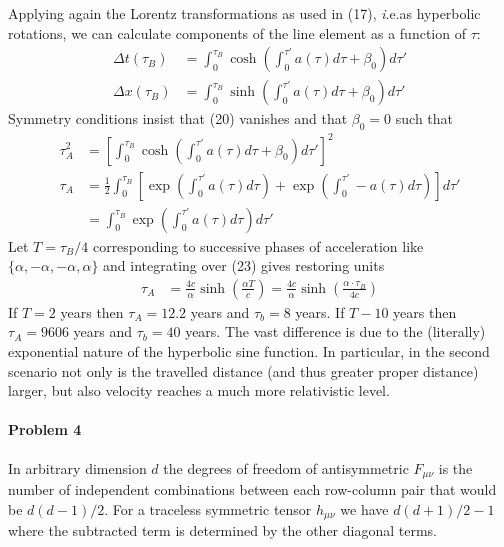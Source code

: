 \documentclass[10pt]{scrartcl}
\newcommand{\ie}{{\textit i.e.}}
\begin{document}
Applying again the Lorentz transformations as used in (17), \ie as hyperbolic rotations, we can calculate components of the line element as a function of $\tau$:
\begin{align}
	\Delta t(\tau_B) &= \int_{0}^{\tau_B}\cosh{\left(\int_{0}^{\tau'}a(\tau)d\tau + \beta_0\right)}d\tau'\\
	\Delta x(\tau_B) &= \int_{0}^{\tau_B}\sinh{\left(\int_{0}^{\tau'}a(\tau)d\tau + \beta_0\right)}d\tau'
\end{align}   
Symmetry conditions insist that (20) vanishes and that $\beta_0=0$ such that
\begin{align}
\tau_A^2 &=	\left[\int_{0}^{\tau_B}\cosh{\left(\int_{0}^{\tau'}a(\tau)d\tau + \beta_0\right)}d\tau'\right]^2\\
\tau_A &=\frac{1}{2}\int_{0}^{\tau_B}\left[\exp{\left(\int_{0}^{\tau'}a(\tau)d\tau\right)}+\exp{\left(\int_{0}^{\tau'}-a(\tau)d\tau\right)}\right]d\tau'\\
 &= \int_{0}^{\tau_B}\exp{\left(\int_{0}^{\tau'}a(\tau)d\tau\right)}d\tau'	
\end{align}
Let $T=\tau_B/4$ corresponding to successive phases of acceleration like $\{\alpha,-\alpha,-\alpha,\alpha\}$ and integrating over (23) gives restoring units
\begin{align}
\tau_A &=\frac{4c}{\alpha}\sinh{\left(\frac{\alpha T}{c}\right)} = \frac{4c}{\alpha}\sinh{\left(\frac{\alpha\cdot \tau_B}{4c}\right)}
\end{align}
If $T = 2$ years then $\tau_A = 12.2$ years and $\tau_b = 8$ years. If $T - 10$ years then $\tau_A = 9606$ years and $\tau_b = 40$ years. The vast difference is due to the (literally) exponential nature of the hyperbolic sine function. In particular, in the second scenario not only is the travelled distance (and thus greater proper distance) larger, but also velocity reaches a much more relativistic level.
\paragraph{Problem 4}
In arbitrary dimension $d$ the degrees of freedom of antisymmetric $F_{\mu\nu}$ is the number of independent combinations between each row-column pair that would be $d(d-1)/2$. For a traceless symmetric tensor $h_{\mu\nu}$ we have $d(d+1)/2-1$ where the subtracted term is determined by the other diagonal terms. 
\end{document}
